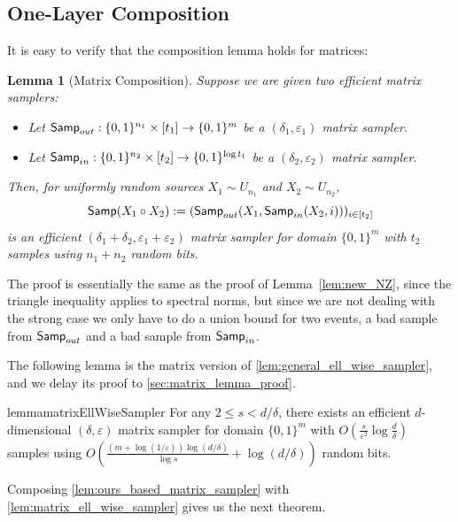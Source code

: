 \documentclass[11pt,letterpaper]{article}
\newtheorem{lemma}[theorem]{Lemma}
\newcommand{\eps}{\varepsilon}
\newcommand{\1}{\mathbbm{1}}
\newcommand{\zo}{\{0, 1\}}
\newcommand{\Smp}{\textup{\textsf{Samp}}}
\begin{document}
\subsection{One-Layer Composition}
It is easy to verify that the composition lemma holds for matrices:
\begin{lemma}[Matrix  Composition]
\label{lem:matrix_composition}
    Suppose we are given two efficient matrix samplers:
\begin{itemize}
    \item  Let $\Smp_{out}: \zo^{n_1} \times [t_1] \to \zo^m$ be a $(\delta_1, \eps_1)$ matrix sampler.
    \item Let $\Smp_{in}: \zo^{n_2} \times [t_2] \to \zo^{\log t_1}$ be a $(\delta_2, \eps_2)$ matrix sampler.
\end{itemize}
 Then, for uniformly random sources $X_{1} \sim U_{n_1}$ and $X_{2} \sim U_{n_2}$, \[
        \Smp(X_1 \circ X_2):= (\Smp_{out}(X_1, \Smp_{in}(X_2, i)))_{i \in [t_2]}
    \]
    is an efficient $(\delta_1 + \delta_2, \eps_1 + \eps_2)$ matrix sampler for domain $\zo^m$ with $t_2$ samples using $n_1 + n_2$ random bits. 
\end{lemma}

The proof is essentially the same as the proof of Lemma~\ref{lem:new_NZ}, since the triangle inequality applies to spectral norms, but since we are not dealing with the strong case we only have to do a union bound for two events, a bad sample from $\Smp_{out}$ and a bad sample from $\Smp_{in}$.

The following lemma is the matrix version of \cref{lem:general_ell_wise_sampler}, and we delay its proof to \cref{sec:matrix_lemma_proof}.

\begin{restatable}{lemma}{matrixEllWiseSampler}
\label{lem:matrix_ell_wise_sampler}
    For any $2 \le s < d / \delta$, there exists an efficient $d$-dimensional $(\delta, \eps)$ matrix sampler for domain $\zo^m$ with $O(\frac{s}{\eps^{2}}\log \frac{d}{\delta})$ samples using 
    $O(\frac{(m + \log(1/\eps)) \log (d / \delta)}{\log s} + \log (d / \delta))$
    random bits.    
\end{restatable}
Composing \cref{lem:ours_based_matrix_sampler} with \cref{lem:matrix_ell_wise_sampler} gives us the next theorem.
\end{document}
